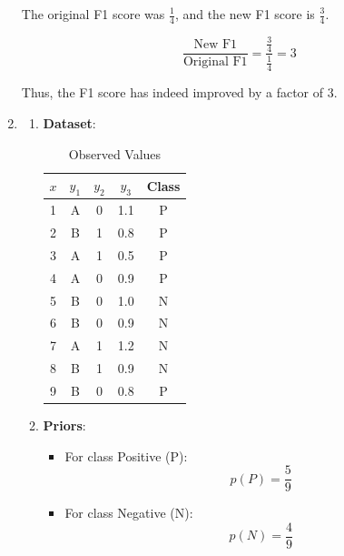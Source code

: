 \documentclass{article}
\begin{document}
\begin{enumerate}[leftmargin=\labelsep]
\vspace{2pt}
\noindent
The original F1 score was $\frac{1}{4}$, and the new F1 score is $\frac{3}{4}$. 

\begin{equation*}
  \frac{\text{New F1}}{\text{Original F1}} = \frac{\frac{3}{4}}{\frac{1}{4}} = 3
\end{equation*}

Thus, the F1 score has indeed improved by a factor of 3.
\item \begin{enumerate}

  \item \textbf{Dataset}:
  \begin{table}[h]
  \centering
  \begin{tabular}{ccccc}
  \toprule
  $x$ & $y_1$ & $y_2$ & $y_3$ & Class \\
  \midrule
  1 & A & 0 & 1.1 & P \\
  2 & B & 1 & 0.8 & P \\
  3 & A & 1 & 0.5 & P \\
  4 & A & 0 & 0.9 & P \\
  5 & B & 0 & 1.0 & N \\
  6 & B & 0 & 0.9 & N \\
  7 & A & 1 & 1.2 & N \\
  8 & B & 1 & 0.9 & N \\
  9 & B & 0 & 0.8 & P \\
  \bottomrule
  \end{tabular}
  \caption{Observed Values}
  \end{table}

  \item \textbf{Priors}:
  \begin{itemize}
      \item For class Positive (P):
      \[
      p(P) = \frac{5}{9}
      \]
      \item For class Negative (N):
      \[
      p(N) = \frac{4}{9}
      \]
  \end{itemize}


\end{enumerate}
\end{enumerate}
\end{document}
